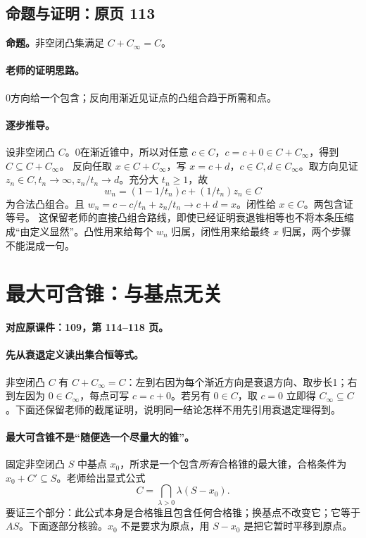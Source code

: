 \documentclass[11pt,a4paper]{article}
\theoremstyle{definition}\newtheorem{definition}{定义}\newtheorem{example}{例}
\begin{document}
\subsection{命题与证明：原页 113}

\textbf{命题。}非空闭凸集满足 $C+C_\infty=C$。

\paragraph{老师的证明思路。}0方向给一个包含；反向用渐近见证点的凸组合趋于所需和点。

\paragraph{逐步推导。}
设非空闭凸 $C$。0在渐近锥中，所以对任意 $c\in C$，$c=c+0\in C+C_\infty$，得到 $C\subseteq C+C_\infty$。
反向任取 $x\in C+C_\infty$，写 $x=c+d$，$c\in C,d\in C_\infty$。取方向见证 $z_n\in C,t_n\to\infty,z_n/t_n\to d$。充分大 $t_n\ge1$，故
\[w_n=(1-1/t_n)c+(1/t_n)z_n\in C\]
为合法凸组合。且 $w_n=c-c/t_n+z_n/t_n\to c+d=x$。闭性给 $x\in C$。两包含证等号。
这保留老师的直接凸组合路线，即使已经证明衰退锥相等也不将本条压缩成“由定义显然”。凸性用来给每个 $w_n$ 归属，闭性用来给最终 $x$ 归属，两个步骤不能混成一句。


\clearpage\section{最大可含锥：与基点无关}\label{g:109:114}

\textbf{对应原课件：109，第 114--118 页。}


\paragraph{先从衰退定义读出集合恒等式。}
非空闭凸 $C$ 有 $C+C_\infty=C$：左到右因为每个渐近方向是衰退方向、取步长1；右到左因为 $0\in C_\infty$，每点可写 $c=c+0$。若另有 $0\in C$，取 $c=0$ 立即得 $C_\infty\subseteq C$。下面还保留老师的截尾证明，说明同一结论怎样不用先引用衰退定理得到。
\paragraph{最大可含锥不是“随便选一个尽量大的锥”。}
固定非空闭凸 $S$ 中基点 $x_0$，所求是一个包含\emph{所有}合格锥的最大锥，合格条件为 $x_0+C'\subseteq S$。老师给出显式公式
\[C=\bigcap_{\lambda>0}\lambda(S-x_0).
\]
要证三个部分：此公式本身是合格锥且包含任何合格锥；换基点不改变它；它等于 $AS$。下面逐部分核验。$x_0$ 不是要求为原点，用 $S-x_0$ 是把它暂时平移到原点。
\end{document}
